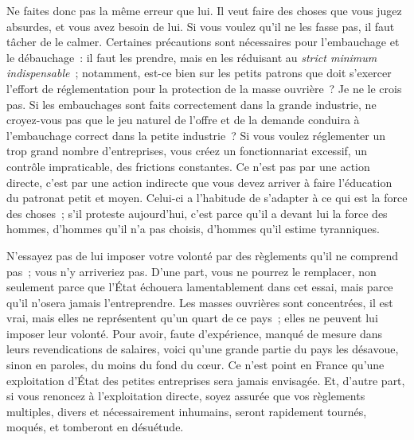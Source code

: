 \documentclass[french,twoside]{book} %
\begin{document}
Ne faites donc pas la même erreur que lui. Il veut faire des choses que vous jugez absurdes, et vous avez besoin de lui. Si vous voulez qu'il ne les fasse pas, il faut tâcher de le calmer. Certaines précautions sont nécessaires pour l'embauchage et le débauchage : il faut les prendre, mais en les réduisant au {\itshape strict minimum indispensable} ; notamment, est-ce bien sur les petits patrons que doit s'exercer l'effort de réglementation pour la protection de la masse ouvrière ? Je ne le crois pas. Si les embauchages sont faits correctement dans la grande industrie, ne croyez-vous pas que le jeu naturel de l'offre et de la demande conduira à l'embauchage correct dans la petite industrie ? Si vous voulez réglementer un trop grand nombre d'entreprises, vous créez un fonctionnariat excessif, un contrôle impraticable, des frictions constantes. Ce n'est pas par une action directe, c'est par une action indirecte que vous devez arriver à faire l'éducation du patronat petit et moyen. Celui-ci a l'habitude de s'adapter à ce qui est la force des choses ; s'il proteste aujourd'hui, c'est parce qu'il a devant lui la force des hommes, d'hommes qu'il n'a pas choisis, d'hommes qu'il estime tyranniques.\par
N'essayez pas de lui imposer votre volonté par des règlements qu'il ne comprend pas ; vous n'y arriveriez pas. D'une part, vous ne pourrez le remplacer, non seulement parce que l'État échouera lamentablement dans cet essai, mais parce qu'il n'osera jamais l'entreprendre. Les masses ouvrières sont concentrées, il est vrai, mais elles ne représentent qu'un quart de ce pays ; elles ne peuvent lui imposer leur volonté. Pour avoir, faute d'expérience, manqué de mesure dans leurs revendications de salaires, voici qu'une grande partie du pays les désavoue, sinon en paroles, du moins du fond du cœur. Ce n'est point en France qu'une exploitation d'État des petites entreprises sera jamais envisagée. Et, d'autre part, si vous renoncez à l'exploitation directe, soyez assurée que vos règlements multiples, divers et nécessairement inhumains, seront rapidement tournés, moqués, et tomberont en désuétude.\par
\end{document}
